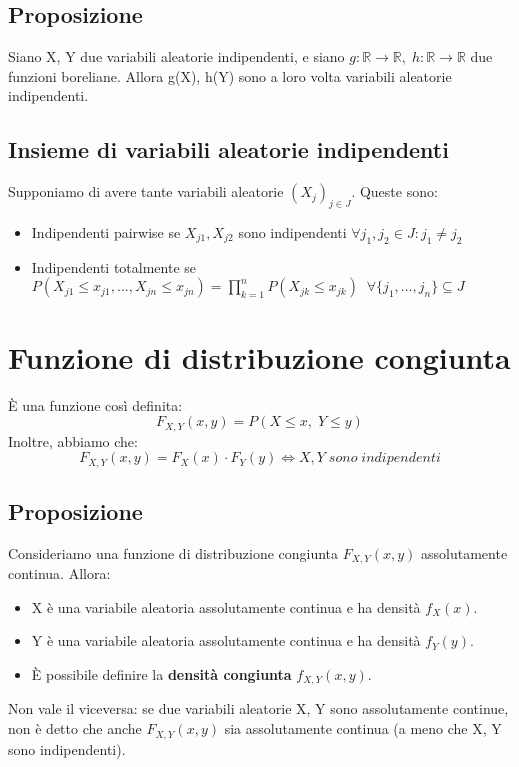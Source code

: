 \documentclass{article}
\begin{document}
\subsection*{Proposizione}
Siano X, Y due variabili aleatorie indipendenti, e siano $g: \mathbb{R} \to \mathbb{R}, \; h: \mathbb{R} \to \mathbb{R}$ due funzioni boreliane. Allora g(X), h(Y) sono a loro volta variabili aleatorie indipendenti.

\subsection*{Insieme di variabili aleatorie indipendenti}
Supponiamo di avere tante variabili aleatorie $(X_{j})_{j \in J}$. Queste sono:
\begin{itemize}
\item Indipendenti pairwise se $X_{j1}, X_{j2}$ sono indipendenti $\forall  j_{1}, j_{2} \in J : j_{1} \neq j_{2}$
\item Indipendenti totalmente se\\
$P(X_{j1} \leq x_{j1},...,X_{jn} \leq x_{jn}) = \prod_{k=1}^{n}P(X_{jk} \leq x_{jk}) \; \; \forall \{j_{1},...,j_{n}\} \subseteq J$
\end{itemize}

\section*{Funzione di distribuzione congiunta}
\`E una funzione così definita:
\[ F_{X,Y}(x,y) = P(X \leq x, \; Y \leq y) \]
Inoltre, abbiamo che:
\[ F_{X,Y}(x,y) = F_{X}(x)\cdot F_{Y}(y) \iff X, Y \; sono \; indipendenti \]

\subsection*{Proposizione}
Consideriamo una funzione di distribuzione congiunta $F_{X,Y}(x,y)$ assolutamente continua. Allora:
\begin{itemize}
\item X è una variabile aleatoria assolutamente continua e ha densità $f_{X}(x)$.
\item Y è una variabile aleatoria assolutamente continua e ha densità $f_{Y}(y)$.
\item \`E possibile definire la \textbf{densità congiunta} $f_{X,Y}(x,y)$.
\end{itemize}
Non vale il viceversa: se due variabili aleatorie X, Y sono assolutamente continue, non è detto che anche $F_{X,Y}(x,y)$ sia assolutamente continua (a meno che X, Y sono indipendenti).
\end{document}
